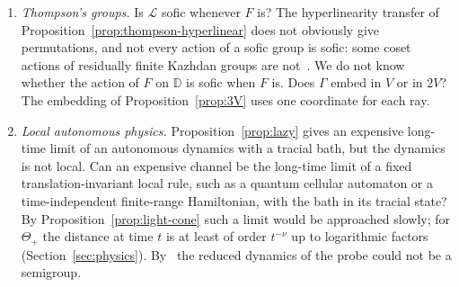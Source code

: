 \begin{enumerate}[label=(\arabic*)]
$w_{2n}=uw_n$ and $w_{2n+1}=tuw_n$ reach the integer $n$ with length $O(\log n)$, and commutators of copies at points of equal parity reduce
freely to smaller indices. What is the area of the commutators at points of opposite parity?
\item \emph{Thompson's groups.} Is $\mathcal L$ sofic whenever $F$ is? The hyperlinearity transfer of Proposition~\ref{prop:thompson-hyperlinear}
does not obviously give permutations, and not every action of a sofic group is sofic: some coset actions of residually finite Kazhdan groups
are not~\cite{KunThom2026}. We do not know whether the action of $F$ on $\mathbb D$ is sofic when $F$ is. Does $\Gamma$ embed in $V$ or
in $2V$? The embedding of Proposition~\ref{prop:3V} uses one coordinate for each ray.
\item \emph{Local autonomous physics.} Proposition~\ref{prop:lazy} gives an expensive long-time limit of an autonomous dynamics with a tracial
bath, but the dynamics is not local. Can an expensive channel be the long-time limit of a fixed translation-invariant local rule, such as a
quantum cellular automaton or a time-independent finite-range Hamiltonian, with the bath in its tracial state? By Proposition~\ref{prop:light-cone}
such a limit would be approached slowly; for $\Theta_+$ the distance at time $t$ is at least of order $t^{-\nu}$ up to logarithmic factors
(Section~\ref{sec:physics}). By~\cite{BhatDevendra2025} the reduced dynamics of the probe could not be a semigroup.
\end{enumerate}
